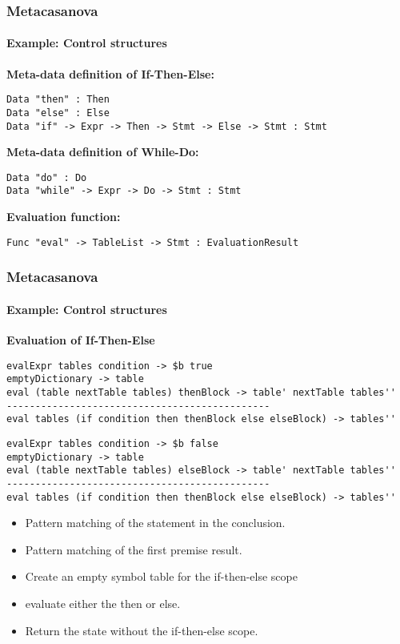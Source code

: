 \documentclass[10pt,a4paper]{beamer}
\begin{document}
\begin{frame}[fragile]
\frametitle{Metacasanova}
\framesubtitle{Example: Control structures}
\textbf{Meta-data definition of If-Then-Else:}
\begin{lstlisting}
Data "then" : Then
Data "else" : Else
Data "if" -> Expr -> Then -> Stmt -> Else -> Stmt : Stmt
\end{lstlisting}

\textbf{Meta-data definition of While-Do:}
\begin{lstlisting}
Data "do" : Do
Data "while" -> Expr -> Do -> Stmt : Stmt
\end{lstlisting}

\textbf{Evaluation function:}
\begin{lstlisting}
Func "eval" -> TableList -> Stmt : EvaluationResult
\end{lstlisting}
\end{frame}

\begin{frame}[fragile]
\frametitle{Metacasanova}
\framesubtitle{Example: Control structures}
\textbf{Evaluation of If-Then-Else}
\begin{lstlisting}
evalExpr tables condition -> $b true
emptyDictionary -> table
eval (table nextTable tables) thenBlock -> table' nextTable tables''
----------------------------------------------
eval tables (if condition then thenBlock else elseBlock) -> tables''
\end{lstlisting}

\begin{lstlisting}
evalExpr tables condition -> $b false
emptyDictionary -> table
eval (table nextTable tables) elseBlock -> table' nextTable tables''
----------------------------------------------
eval tables (if condition then thenBlock else elseBlock) -> tables''
\end{lstlisting}

\begin{itemize}
	\item Pattern matching of the statement in the conclusion.
	\item Pattern matching of the first premise result.
	\item Create an empty symbol table for the if-then-else scope
	\item evaluate either the then or else. 
	\item Return the state without the if-then-else scope.
\end{itemize}
\end{frame}
\end{document}
